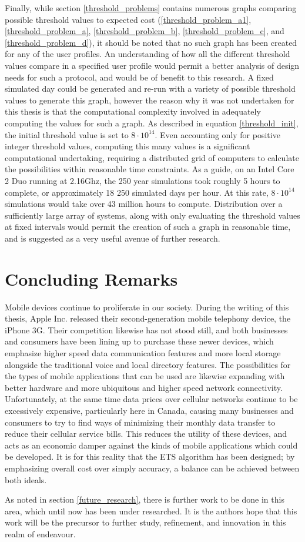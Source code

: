 Finally, while section \ref{threshold_problems} contains numerous graphs comparing possible threshold values to expected cost (\ref{threshold_problem_a1}, \ref{threshold_problem_a}, \ref{threshold_problem_b}, \ref{threshold_problem_c}, and \ref{threshold_problem_d}), it should be noted that no such graph has been created for any of the user profiles.  An understanding of how all the different threshold values compare in a specified user profile would permit a better analysis of design needs for such a protocol, and would be of benefit to this research.  A fixed simulated day could be generated and re-run with a variety of possible threshold values to generate this graph, however the reason why it was not undertaken for this thesis is that the computational complexity involved in adequately computing the values for such a graph.  As described in equation \ref{threshold_init}, the initial threshold value is set to $8 \cdot 10^{14}$.  Even accounting only for positive integer threshold values, computing this many values is a significant computational undertaking, requiring a distributed grid of computers to calculate the possibilities within reasonable time constraints.  As a guide, on an Intel Core 2 Duo running at 2.16Ghz, the 250 year simulations took roughly 5 hours to complete, or approximately 18 250 simulated days per hour.  At this rate, $8 \cdot 10^{14}$ simulations would take over 43 million hours to compute.  Distribution over a sufficiently large array of systems, along with only evaluating the threshold values at fixed intervals would permit the creation of such a graph in reasonable time, and is suggested as a very useful avenue of further research.

\section{Concluding Remarks}

Mobile devices continue to proliferate in our society.  During the writing of this thesis, Apple Inc. released their second-generation mobile telephony device, the iPhone 3G.  Their competition likewise has not stood still, and both businesses and consumers have been lining up to purchase these newer devices, which emphasize higher speed data communication features and more local storage alongside the traditional voice and local directory features.  The possibilities for the types of mobile applications that can be used are likewise expanding with better hardware and more ubiquitous and higher speed network connectivity.  Unfortunately, at the same time data prices over cellular networks continue to be excessively expensive, particularly here in Canada, causing many businesses and consumers to try to find ways of minimizing their monthly data transfer to reduce their cellular service bills.  This reduces the utility of these devices, and acts as an economic damper against the kinds of mobile applications which could be developed.  It is for this reality that the ETS algorithm has been designed; by emphasizing overall cost over simply accuracy, a balance can be achieved between both ideals.

As noted in section \ref{future_research}, there is further work to be done in this area, which until now has been under researched.  It is the authors hope that this work will be the precursor to further study, refinement, and innovation in this realm of endeavour.
